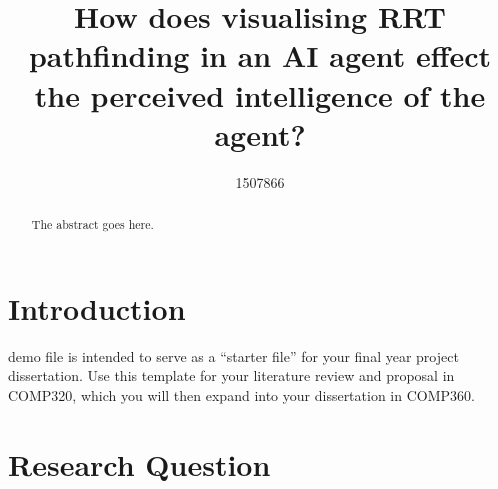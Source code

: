 \documentclass[journal]{IEEEtran}
\begin{document}
%
\title{How does visualising RRT pathfinding in an AI agent effect the perceived intelligence of the agent?}
%
%
\author{1507866}


\maketitle

\begin{abstract}
The abstract goes here.
\end{abstract}

\section{Introduction}
% 
% 
% 
% 
 demo file is intended to serve as a ``starter file''
for your final year project dissertation.
Use this template for your literature review and proposal in COMP320,
which you will then expand into your dissertation in COMP360.

\section{Research Question}
\end{document}
